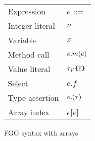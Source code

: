 \documentclass[acmsmall,screen]{acmart}
\begin{document}
\begin{figure}
{\begin{minipage}[t]{0.4\textwidth}
\begin{tabular}[t]{ll}
                Expression                        & $e$ ::=                                            \\
                \quad Integer literal             & \quad$n$                                           \\
                \quad Variable                    & \quad $x$                                          \\
                \quad Method call                 & \quad $e.m(\overline{e})$                                \\
                \quad Value literal               & \quad ${\color{black}\tau_V}\texttt{\{}\overline{e}\texttt{\}}$                  \\
                \quad Select                      & \quad $e.f$                                        \\
                \quad Type assertion              & \quad $e.({\color{black}\tau})$                           \\
                \quad Array index                 & \quad$e$[$e$]
            \end{tabular}
        \end{minipage}
    }
    \caption{FGG syntax with arrays}
\end{figure}
\end{document}
